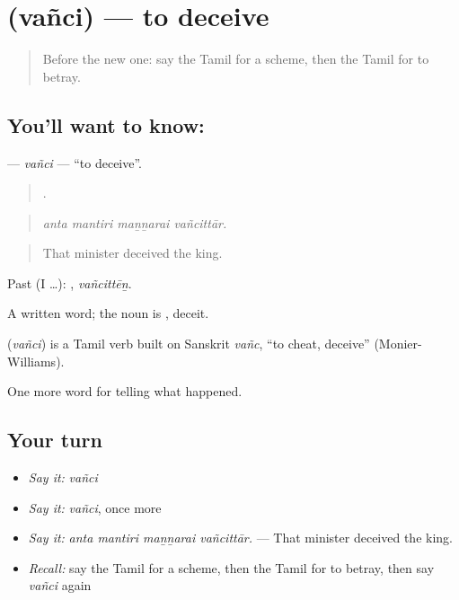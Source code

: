 \section[\texorpdfstring{\ta{வஞ்சி} (vañci)}{வஞ்சி (vañci)}]{ (vañci) — to deceive}

\label{lesson:TA-C337-vanci}



\begin{quote}
Before the new one: say the Tamil for a scheme, then the Tamil for to betray.
\end{quote}

\subsection*{You'll want to know: }
\textbf{} — \emph{vañci} — \textquotedblleft{}to deceive\textquotedblright{}.

\begin{quote}
   .
\end{quote}

\begin{quote}
\emph{anta mantiri maṉṉarai vañcittār.}
\end{quote}

\begin{quote}
That minister deceived the king.
\end{quote}

Past (I …): , \emph{vañcittēṉ}.

A written word; the noun is , deceit.

\begin{cousinweb}
\textbf{} (\emph{vañci}) is a Tamil verb built on Sanskrit \emph{vañc}, \textquotedblleft{}to cheat, deceive\textquotedblright{} (Monier-Williams).
\end{cousinweb}

\begin{grammarlens}[title={What you've built}]
One more word for telling what happened.
\end{grammarlens}

\subsection*{Your turn}
\begin{itemize}
\raggedright
  \item \emph{Say it:} \emph{vañci}
  \item \emph{Say it:} \emph{vañci}, once more
  \item \emph{Say it:} \emph{anta mantiri maṉṉarai vañcittār.} — That minister deceived the king.
  \item \emph{Recall:} say the Tamil for a scheme, then the Tamil for to betray, then say \emph{vañci} again
\end{itemize}

